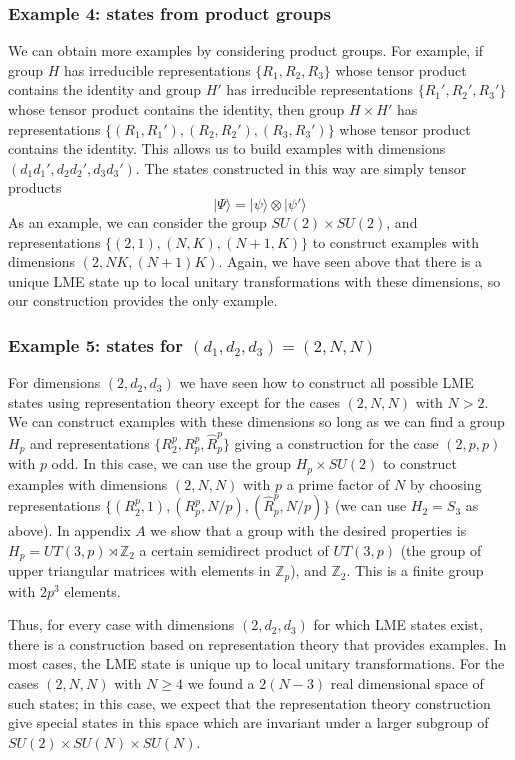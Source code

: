 \documentclass[12pt]{article}
\theoremstyle{definition}
\newcommand{\be}{\begin{equation}}
\newcommand{\ee}{\end{equation}}
\begin{document}
\subsubsection*{Example 4: states from product groups}

We can obtain more examples by considering product groups. For example, if group $H$ has irreducible representations $\{R_1,R_2,R_3\}$ whose tensor product contains the identity and group $H'$ has irreducible representations $\{R_1',R_2',R_3'\}$ whose tensor product contains the identity, then group $H \times H'$ has representations $\{(R_1,R_1'),(R_2,R_2'),(R_3,R_3')\}$ whose tensor product contains the identity. This allows us to build examples with dimensions $(d_1 d_1',d_2 d_2', d_3 d_3')$. The states constructed in this way are simply tensor products
\be
|\Psi \rangle = |\psi \rangle \otimes |\psi' \rangle
\ee
As an example, we can consider the group $SU(2) \times SU(2)$, and representations $\{(2,1),(N,K),(N+1,K)\}$ to construct examples with dimensions $(2,NK,(N+1)K)$. Again, we have seen above that there is a unique LME state up to local unitary transformations with these dimensions, so our construction provides the only example.

\subsubsection*{Example 5: states for $(d_1,d_2,d_3) = (2,N,N)$}

For dimensions $(2,d_2,d_3)$ we have seen how to construct all possible LME states using representation theory except for the cases $(2,N,N)$ with $N > 2$. We can construct examples with these dimensions so long as we can find a group $H_p$ and representations $\{R^p_2, R_p^p,\hat{R}_p^p\}$ giving a construction for the case $(2,p,p)$ with $p$ odd. In this case, we can use the group $H_p \times SU(2)$ to construct examples with dimensions $(2,N,N)$ with $p$ a prime factor of $N$ by choosing representations $\{(R^p_2,1), (R_p^p,N/p),(\hat{R}_p^p,N/p)\}$ (we can use $H_2 = S_3$ as above). In appendix $A$ we show that a group with the desired properties is $H_p = UT(3,p) \rtimes \mathbb{Z}_2$ a certain semidirect product of $UT(3,p)$ (the group of upper triangular matrices with elements in $\mathbb{Z}_p$), and $\mathbb{Z}_2$. This is a finite group with $2p^3$ elements.

Thus, for every case with dimensions $(2,d_2,d_3)$ for which LME states exist, there is a construction based on representation theory that provides examples. In most cases, the LME state is unique up to local unitary transformations. For the cases $(2,N,N)$ with $N \ge 4$ we found a $2(N-3)$ real dimensional space of such states; in this case, we expect that the representation theory construction give special states in this space which are invariant under a larger subgroup of $SU(2) \times SU(N) \times SU(N)$.
\end{document}

